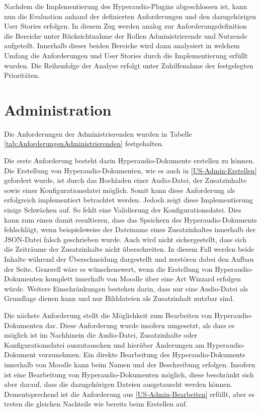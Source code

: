 \label{cap:evaluation}
Nachdem die Implementierung des Hyperaudio-Plugins abgeschlossen ist, kann nun die Evaluation anhand der definierten Anforderungen und den dazugehörigen User Stories erfolgen. In diesem Zug werden analog zur Anforderungsdefinition die Bereiche unter Rücksichtnahme der Rollen Administrierende und Nutzende aufgeteilt. Innerhalb dieser beiden Bereiche wird dann analysiert in welchem Umfang die Anforderungen und User Stories durch die Implementierung erfüllt wurden. Die Reihenfolge der Analyse erfolgt unter Zuhilfenahme der festgelegten Prioritäten.

\section{Administration}
\label{sec:eval_administration}
Die Anforderungen der Administrierenden wurden in Tabelle \ref{tab:AnforderungenAdministrierenden} festgehalten.

Die erste Anforderung besteht darin Hyperaudio-Dokumente erstellen zu können. Die Erstellung von Hyperaudio-Dokumenten, wie es auch in \ref{US-Admin-Erstellen} gefordert wurde, ist durch das Hochladen einer Audio-Datei, der Zusatzinhalte sowie einer Konfigurationsdatei möglich. Somit kann diese Anforderung als erfolgreich implementiert betrachtet werden. Jedoch zeigt diese Implementierung einige Schwächen auf. So fehlt eine Validierung der Konfigurationsdatei. Dies kann zum einen damit resultieren, dass das Speichern des Hyperaudio-Dokuments fehlschlägt, wenn beispielsweise der Dateiname eines Zusatzinhaltes innerhalb der JSON-Datei falsch geschrieben wurde. Auch wird nicht sichergestellt, dass sich die Zeiträume der Zusatzinhalte nicht überschreiten. In diesem Fall werden beide Inhalte während der Überschneidung dargestellt und zerstören dabei den Aufbau der Seite. Generell wäre es wünschenswert, wenn die Erstellung von Hyperaudio-Dokumenten komplett innerhalb von Moodle über eine Art Wizzard erfolgen würde. Weitere Einschränkungen bestehen darin, dass nur eine Audio-Datei als Grundlage dienen kann und nur Bilddateien als Zusatzinhalt nutzbar sind.

Die nächste Anforderung stellt die Möglichkeit zum Bearbeiten von Hyperaudio-Dokumenten dar. Diese Anforderung wurde insofern umgesetzt, als dass es möglich ist im Nachhinein die Audio-Datei, Zusatzinhalte oder Konfigurationsdatei auszutauschen und hierüber Änderungen am Hyperaudio-Dokument vorzunehmen. Ein direkte Bearbeitung des Hyperaudio-Dokuments innerhalb von Moodle kann beim Namen und der Beschreibung erfolgen. Insofern ist eine Bearbeitung von Hyperaudio-Dokumenten möglich, diese beschränkt sich aber darauf, dass die dazugehörigen Dateien ausgetauscht werden können. Dementsprechend ist die Anforderung aus \ref{US-Admin-Bearbeiten} erfüllt, aber es treten die gleichen Nachteile wie bereits beim Erstellen auf.

